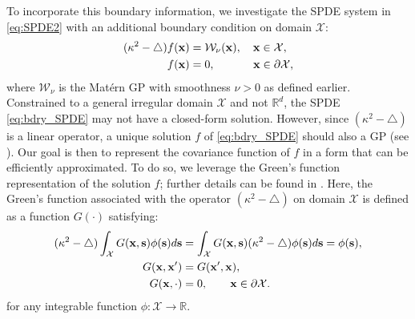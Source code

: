 \documentclass[aos,preprint]{imsart}
\theoremstyle{plain}
\newcommand{\Real}{\mathbb R}
\newcommand{\CalX}{\mathcal X}
\newcommand{\Bx}{\bold x}
\newcommand{\Bs}{\bold s}
\newcommand{\BFx}{\bold x}
\newcommand{\CalW}{\mathcal{W}}
\theoremstyle{remark}
\begin{document}
To incorporate this boundary information, we investigate the SPDE system in \eqref{eq:SPDE2} with an additional boundary condition on domain $\mathcal{X}$:
\begin{align}
\begin{split}
    (\kappa^2-\bigtriangleup)f(\BFx)&=\CalW_\nu(\BFx), \quad \BFx\in\CalX, 
    \\
    f(\Bx)&=0,\quad \quad \; \; \; \; \; \Bx\in\partial\CalX,\\
\end{split}
\label{eq:bdry_SPDE}
\end{align}
where $\CalW_\nu$ is the Mat\'ern GP with smoothness $\nu>0$ as defined earlier. Constrained to a general irregular domain $\mathcal{X}$ and not $\Real^d$, the SPDE \eqref{eq:bdry_SPDE} may not have a closed-form solution. However, since $(\kappa^2-\bigtriangleup)$ is a linear operator, a unique solution $f$ of \eqref{eq:bdry_SPDE} should also a GP (see \cite[Chapter 4]{lifshits2012lectures}). Our goal is then to represent the covariance function of $f$ in a form that can be efficiently approximated. To do so, we leverage the Green's function representation \citep{folland2009fourier} of the solution $f$; further details can be found in \cite{sakellaris2021scale}. Here, the Green's function associated with the operator $(\kappa^2-\bigtriangleup)$ on domain $\mathcal{X}$ is defined as a function $G(\cdot)$ satisfying:
\begin{align}
\begin{split}
    (\kappa^2-\bigtriangleup)\int_\CalX G(\BFx,\Bs)\phi(\Bs) d\Bs&=\int_\CalX G(\BFx,\Bs)(\kappa^2-\bigtriangleup)\phi(\Bs) d\Bs=\phi(\Bs),\\
    G(\BFx,\Bx')&=G(\BFx',\Bx),\\
    G(\Bx,\cdot)&=0, \quad \quad \Bx\in \partial\CalX.
\end{split}
\label{eq:greendef}
\end{align}
for any integrable function $\phi : \mathcal{X} \rightarrow \Real$.
\end{document}
